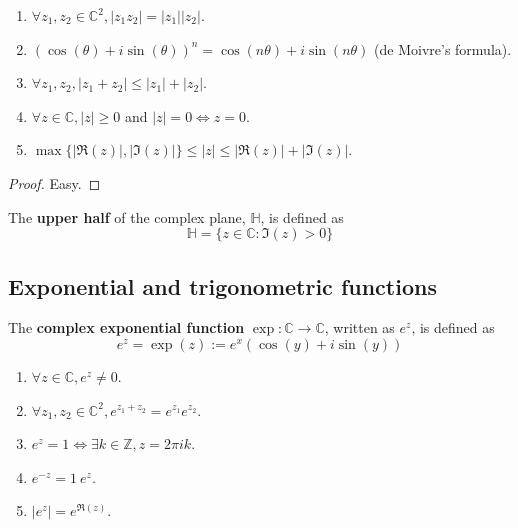 \begin{corollary}
	\hfill
	\begin{enumerate}
		\item $\forall z_1, z_2 \in \mathbb{C}^2, |z_1 z_2| = |z_1| |z_2|$.
		\item ${(\cos(\theta) + i \sin(\theta))}^n = \cos(n \theta) + i \sin(n \theta)$ (de Moivre's formula).
		\item $\forall z_1, z_2, |z_1 + z_2| \le |z_1| + |z_2|$.
		\item $\forall z \in \mathbb{C}, |z| \ge 0$ and $|z| = 0 \Longleftrightarrow z = 0$.
		\item $\max \{ |\Re(z)|, |\Im(z)| \} \le |z| \le |\Re(z)| + |\Im(z)|$.
	\end{enumerate}
\end{corollary}

\begin{proof}
	Easy.
\end{proof}

\begin{definition}
	The \textbf{upper half} of the complex plane, $\mathbb{H}$, is defined as
	\[
		\mathbb{H} = \{ z \in \mathbb{C}: \Im(z) > 0 \}
	\]
\end{definition}

\subsection{Exponential and trigonometric functions}

\begin{definition}
	The \textbf{complex exponential function} $\exp: \mathbb{C} \rightarrow \mathbb{C}$, written as $e^z$, is defined as
	\[
		e^z = \exp(z) := e^x (\cos(y) + i \sin(y))
	\]
\end{definition}

\begin{proposition}\label{prop:expProperties}
	\hfill
	\begin{enumerate}
		\item $\forall z \in \mathbb{C}, e^z \ne 0$.
		\item $\forall z_1, z_2 \in \mathbb{C}^2, e^{z_1 + z_2} = e^{z_1} e^{z_2}$.
		\item $e^z = 1 \Longleftrightarrow \exists k \in \mathbb{Z}, z = 2 \pi i k$.
		\item $e^{-z} = 1 \ e^z$.
		\item $|e^z| = e^{\Re(z)}$.
	\end{enumerate}
\end{proposition}

